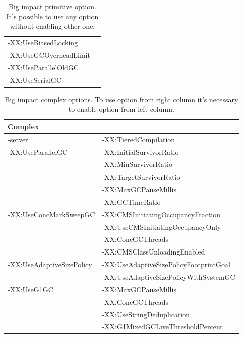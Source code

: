 \documentclass[
  digital, %
  oneside,
  notable, %
  nolof,     %
  nolot     %
]{fithesis3}
\begin{document}
\begin{table}[]
\begin{tabular}{ll}
	\multicolumn{1}{|l|}{-XX:UseBiasedLocking}                       &                                                             \\ \cline{1-1}
	\multicolumn{1}{|l|}{-XX:UseGCOverheadLimit}                     &                                                             \\ \cline{1-1}
	\multicolumn{1}{|l|}{-XX:UseParallelOldGC}                       &                                                             \\ \cline{1-1}
	\multicolumn{1}{|l|}{-XX:UseSerialGC}                            &                                                             \\ \cline{1-1}
	\end{tabular}
	\caption{Big impact primitive option. It's possible to use any option without enabling other one.}
	\label{bigimpactprimitive}
\end{table}
		
\begin{table}[]
	\centering
	\begin{tabular}{|l|l|}
		\hline
		\multicolumn{2}{|l|}{\textbf{Complex}}                                              \\ \hline
		-server                                    & -XX:TieredCompilation                  \\ \hline
		\multirow{5}{*}{-XX:UseParallelGC}         & -XX:InitialSurvivorRatio               \\ \cline{2-2} 
		& -XX:MinSurvivorRatio                   \\ \cline{2-2} 
		& -XX:TargetSurvivorRatio                \\ \cline{2-2} 
		& -XX:MaxGCPauseMillis                   \\ \cline{2-2} 
		& -XX:GCTimeRatio                        \\ \hline
		\multirow{4}{*}{-XX:UseConcMarkSweepGC}    & -XX:CMSInitiatingOccupancyFraction     \\ \cline{2-2} 
		& -XX:UseCMSInitiatingOccupancyOnly      \\ \cline{2-2} 
		& -XX:ConcGCThreads                      \\ \cline{2-2} 
		& -XX:CMSClassUnloadingEnabled           \\ \hline
		\multirow{2}{*}{-XX:UseAdaptiveSizePolicy} & -XX:UseAdaptiveSizePolicyFootprintGoal \\ \cline{2-2} 
		& -XX:UseAdaptiveSizePolicyWithSystemGC  \\ \hline
		\multirow{4}{*}{-XX:UseG1GC}               & -XX:MaxGCPauseMillis                    \\ \cline{2-2} 
		& -XX:ConcGCThreads                      \\ \cline{2-2} 
		& -XX:UseStringDeduplication             \\ \cline{2-2} 
		& -XX:G1MixedGCLiveThresholdPercent      \\ \hline
	\end{tabular}
	\caption{Big impact complex options. To use option from right column it's necessary to enable option from left column.}
	\label{bigimpactcomplex}
\end{table}
\end{document}
